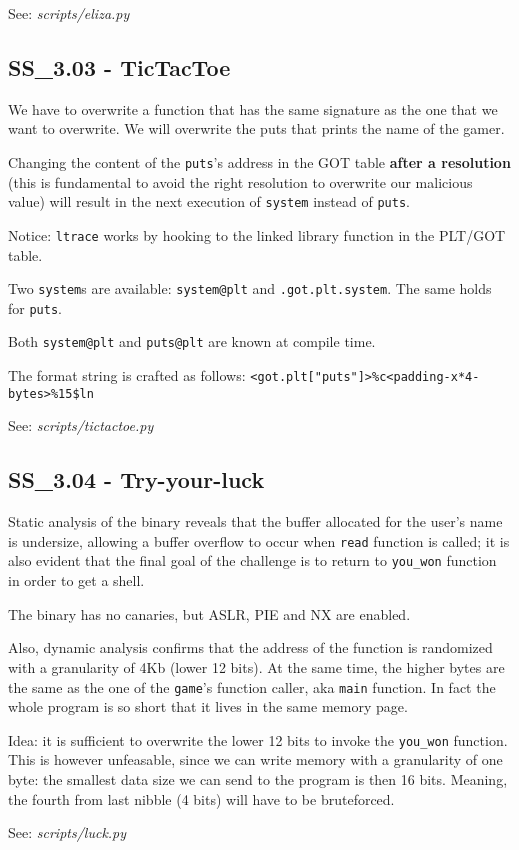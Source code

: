 See: \textit{scripts/eliza.py}

\subsection{SS_3.03 - TicTacToe}
We have to overwrite a function that has the same signature as the one that we want to overwrite.
We will overwrite the puts that prints the name of the gamer.

Changing the content of the \texttt{puts}'s address in the GOT table \textbf{after a resolution} (this is fundamental to avoid the right resolution to overwrite our malicious value) will result in the next execution of \texttt{system} instead of \texttt{puts}. 

Notice: \texttt{ltrace} works by hooking to the linked library function in the PLT/GOT table.

Two \texttt{system}s are available: \texttt{system@plt} and \texttt{.got.plt.system}. The same holds for \texttt{puts}.

Both \texttt{system@plt} and \texttt{puts@plt} are known at compile time.

The format string is crafted as follows: \texttt{<got.plt["puts"]>\%<num-char-equivalent-to-system@plt-addr>c<padding-x*4-bytes>\%15\$ln}

See: \textit{scripts/tictactoe.py}

\subsection{SS_3.04 - Try-your-luck}
Static analysis of the binary reveals that the buffer allocated for the user's name is undersize, allowing a buffer overflow to occur when \texttt{read} function is called;
it is also evident that the final goal of the challenge is to return to \texttt{you_won} function in order to get a shell.

The binary has no canaries, but ASLR, PIE and NX are enabled.

Also, dynamic analysis confirms that the address of the function is randomized with a granularity of 4Kb (lower 12 bits).
At the same time, the higher bytes are the same as the one of the \texttt{game}'s function caller, aka \texttt{main} function.
In fact the whole program is so short that it lives in the same memory page.

Idea: it is sufficient to overwrite the lower 12 bits to invoke the \texttt{you_won} function.
This is however unfeasable, since we can write memory with a granularity of one byte: the smallest data size we can send to the program is then 16 bits.
Meaning, the fourth from last nibble (4 bits) will have to be bruteforced.

See: \textit{scripts/luck.py}